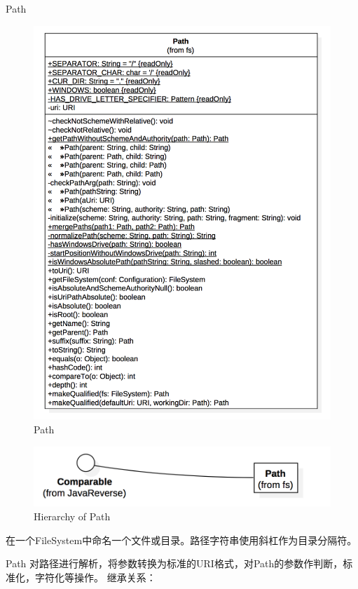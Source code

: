 Path

\begin{figure}
\centering
\includegraphics[width =1\linewidth]{uml/outputstream/6.png}
\caption{Path}
\label{fig:Path}
\end{figure}

\begin{figure}
\centering
\includegraphics[width =1\linewidth]{uml/outputstream/7.png}
\caption{Hierarchy of Path}
\label{fig:Hierarchy of Path}
\end{figure}

在一个FileSystem中命名一个文件或目录。路径字符串使用斜杠作为目录分隔符。

Path 对路径进行解析，将参数转换为标准的URI格式，对Path的参数作判断，标准化，字符化等操作。
继承关系：

